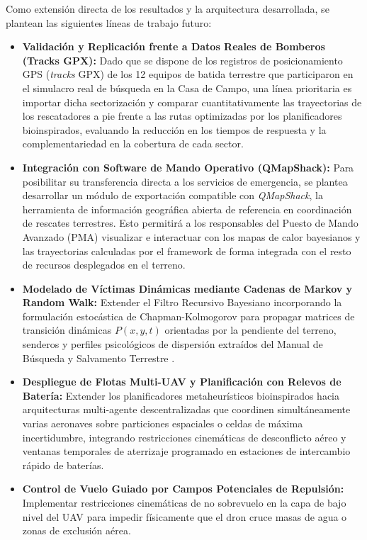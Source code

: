 Como extensión directa de los resultados y la arquitectura desarrollada, se plantean las siguientes líneas de trabajo futuro:

\begin{itemize}
    \item \textbf{Validación y Replicación frente a Datos Reales de Bomberos (Tracks GPX):} 
    Dado que se dispone de los registros de posicionamiento GPS (\textit{tracks} GPX) de los 12 equipos de batida terrestre que participaron en el simulacro real de búsqueda en la Casa de Campo, una línea prioritaria es importar dicha sectorización y comparar cuantitativamente las trayectorias de los rescatadores a pie frente a las rutas optimizadas por los planificadores bioinspirados, evaluando la reducción en los tiempos de respuesta y la complementariedad en la cobertura de cada sector.

    \item \textbf{Integración con Software de Mando Operativo (QMapShack):} 
    Para posibilitar su transferencia directa a los servicios de emergencia, se plantea desarrollar un módulo de exportación compatible con \textit{QMapShack}, la herramienta de información geográfica abierta de referencia en coordinación de rescates terrestres. Esto permitirá a los responsables del Puesto de Mando Avanzado (PMA) visualizar e interactuar con los mapas de calor bayesianos y las trayectorias calculadas por el framework de forma integrada con el resto de recursos desplegados en el terreno.
    
    \item \textbf{Modelado de Víctimas Dinámicas mediante Cadenas de Markov y Random Walk:} 
    Extender el Filtro Recursivo Bayesiano incorporando la formulación estocástica de Chapman-Kolmogorov \cite{Chapman-Kolmogorov} para propagar matrices de transición dinámicas $P(x, y, t)$ orientadas por la pendiente del terreno, senderos y perfiles psicológicos de dispersión extraídos del Manual de Búsqueda y Salvamento Terrestre \cite{romero2018manual}.
    
    \item \textbf{Despliegue de Flotas Multi-UAV y Planificación con Relevos de Batería:} 
    Extender los planificadores metaheurísticos bioinspirados hacia arquitecturas multi-agente descentralizadas que coordinen simultáneamente varias aeronaves sobre particiones espaciales o celdas de máxima incertidumbre, integrando restricciones cinemáticas de desconflicto aéreo y ventanas temporales de aterrizaje programado en estaciones de intercambio rápido de baterías.

    \item \textbf{Control de Vuelo Guiado por Campos Potenciales de Repulsión:} 
    Implementar restricciones cinemáticas de no sobrevuelo en la capa de bajo nivel del UAV para impedir físicamente que el dron cruce masas de agua o zonas de exclusión aérea.
\end{itemize}
